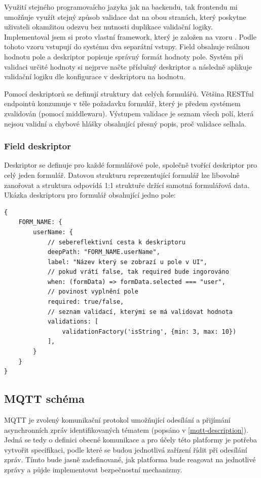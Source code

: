Využití stejného programovaícho jazyka jak na backendu, tak frontendu mi umožňuje využít stejný způsob validace dat na obou stranách, který poskytne uživateli okamžitou odezvu bez nutnosti duplikace validační logiky. Implementoval jsem si proto vlastní framework, který je založen na vzoru  \cite{field-descriptor-pattern}. Podle tohoto vzoru vstupují do systému dva separátní vstupy. Field obsahuje reálnou hodnotu pole a deskriptor popisuje správný formát hodnoty pole. Systém při validaci určité hodnoty si nejprve načte příslušný deskriptor a následně aplikuje validační logiku dle konfigurace v deskriptoru na hodnotu.

Pomocí deskriptorů se definují struktury dat celých formulářů. Většina RESTful endpointů konzumuje v těle požadavku formulář, který je předem systémem zvalidován (pomocí middlewaru). Výstupem validace je seznam všech polí, která nejsou validní a chybové hlášky obsahující přesný popis, proč validace selhala.

\subsubsection{Field deskriptor}
Deskriptor se definuje pro každé formulářové pole, společně tvořící deskriptor pro celý jeden formulář. Datovou strukturu reprezentující formulář lze libovolně zanořovat a struktura odpovídá 1:1 struktuře držící samotná formulářová data. Ukázka deskriptoru pro formulář obsahující jedno pole:

\begin{verbatim}
{
    FORM_NAME: {
        userName: {
            // sebereflektivní cesta k deskriptoru
            deepPath: "FORM_NAME.userName",        
            label: "Název který se zobrazí u pole v UI",
            // pokud vrátí false, tak required bude ingorováno
            when: (formData) => formData.selected === "user", 
            // povinost vyplnění pole 
            required: true/false,
            // seznam validací, kterými se má validovat hodnota
            validations: [
                validationFactory('isString', {min: 3, max: 10})
            ],   
        }
    }
}
\end{verbatim}


\subsection{MQTT schéma}
MQTT je zvolený komunikační protokol umožňující odesílání a přijímání asynchronních zpráv identifikovaných tématem (popsáno v \ref{mqtt-description}). Jedná se tedy o definici obecné komunikace a pro účely této platformy je potřeba vytvořit specifikaci, podle které se budou jednotlivá zařízení řídit při odesílání zpráv. Tímto bude jasně zadefinované, jak platforma bude reagovat na jednotlivé zprávy a půjde implementovat bezpečnostní mechanizmy.

